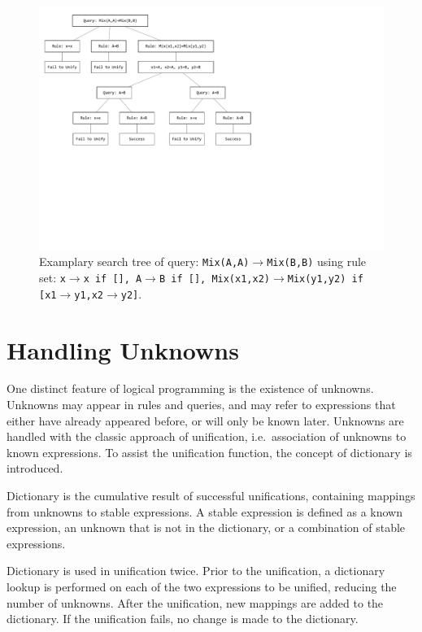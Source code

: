\documentclass[11pt,a4paper]{article}
\begin{document}
\begin{figure}[htbp]
	\centering
	\includegraphics[scale=0.8]{search_tree.pdf}
	\caption{Examplary search tree of query: \texttt{Mix(A,A)$\rightarrow$Mix(B,B)} using rule set: \texttt{x$\rightarrow$x if [], A$\rightarrow$B if [], Mix(x1,x2)$\rightarrow$Mix(y1,y2) if [x1$\rightarrow$y1,x2$\rightarrow$y2]}.}
	\label{fig:ex}
\end{figure}

\section{Handling Unknowns}

One distinct feature of logical programming is the existence of unknowns. Unknowns may appear in rules and queries, and may refer to expressions that either have already appeared before, or will only be known later. Unknowns are handled with the classic approach of unification, i.e.\ association of unknowns to known expressions. To assist the unification function, the concept of dictionary is introduced.

Dictionary is the cumulative result of successful unifications, containing mappings from unknowns to stable expressions. A stable expression is defined as a known expression, an unknown that is not in the dictionary, or a combination of stable expressions.

Dictionary is used in unification twice. Prior to the unification, a dictionary lookup is performed on each of the two expressions to be unified, reducing the number of unknowns. After the unification, new mappings are added to the dictionary. If the unification fails, no change is made to the dictionary.
\end{document}
